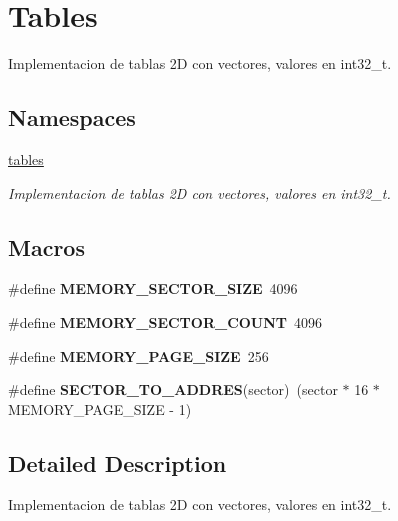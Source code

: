 \hypertarget{group__Tables}{}\section{Tables}
\label{group__Tables}


Implementacion de tablas 2D con vectores, valores en int32\+\_\+t.  


\subsection*{Namespaces}
\begin{DoxyCompactItemize}
\item 
 \hyperlink{namespacetables}{tables}
\begin{DoxyCompactList}\small\item\em Implementacion de tablas 2D con vectores, valores en int32\+\_\+t. \end{DoxyCompactList}\end{DoxyCompactItemize}
\subsection*{Macros}
\begin{DoxyCompactItemize}
\item 
\mbox{\label{group__Tables_ga04fa27dc99bae1e676fd6a65695ab272}} 
\#define {\bfseries M\+E\+M\+O\+R\+Y\+\_\+\+S\+E\+C\+T\+O\+R\+\_\+\+S\+I\+ZE}~4096
\item 
\mbox{\label{group__Tables_ga9544ad8232a908fb374ab10dc85044ea}} 
\#define {\bfseries M\+E\+M\+O\+R\+Y\+\_\+\+S\+E\+C\+T\+O\+R\+\_\+\+C\+O\+U\+NT}~4096
\item 
\mbox{\label{group__Tables_gacec51ea00872290be9953f8a76ba1e2b}} 
\#define {\bfseries M\+E\+M\+O\+R\+Y\+\_\+\+P\+A\+G\+E\+\_\+\+S\+I\+ZE}~256
\item 
\mbox{\label{group__Tables_ga79ab0f4b5245b5d5450e444591d470b2}} 
\#define {\bfseries S\+E\+C\+T\+O\+R\+\_\+\+T\+O\+\_\+\+A\+D\+D\+R\+ES}(sector)~(sector $\ast$ 16 $\ast$ M\+E\+M\+O\+R\+Y\+\_\+\+P\+A\+G\+E\+\_\+\+S\+I\+ZE -\/ 1)
\end{DoxyCompactItemize}


\subsection{Detailed Description}
Implementacion de tablas 2D con vectores, valores en int32\+\_\+t. 

